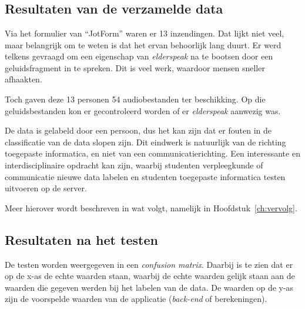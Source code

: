 
\chapter{}
\label{ch:resultaten}

\section{Resultaten van de verzamelde data}
Via het formulier van ``JotForm'' waren er 13 inzendingen. Dat lijkt niet veel, maar belangrijk om te weten is dat het ervan behoorlijk lang duurt. Er werd telkens gevraagd om een eigenschap van \textit{elderspeak} na te bootsen door een geluidsfragment in te spreken. Dit is veel werk, waardoor mensen sneller afhaakten.

Toch gaven deze 13 personen 54 audiobestanden ter beschikking. Op die geluidsbestanden kon er gecontroleerd worden of er \textit{elderspeak} aanwezig was.

De data is gelabeld door een persoon, dus het kan zijn dat er fouten in de classificatie van de data slopen zijn. Dit eindwerk is natuurlijk van de richting toegepaste informatica, en niet van een communicatierichting. Een interessante en interdisciplinaire opdracht kan zijn, waarbij studenten verpleegkunde of communicatie nieuwe data labelen en studenten toegepaste informatica testen uitvoeren op de server.

Meer hierover wordt beschreven in wat volgt, namelijk in Hoofdstuk~\ref{ch:vervolg}.

\section{Resultaten na het testen}
De testen worden weergegeven in een \textit{confusion matrix}. Daarbij is te zien dat er op de x-as de echte waarden staan, waarbij de echte waarden gelijk staan aan de waarden die gegeven werden bij het labelen van de data. De waarden op de y-as zijn de voorspelde waarden van de applicatie (\textit{back-end} of berekeningen).

